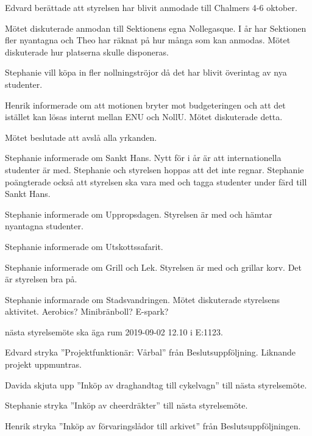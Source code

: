 \documentclass[10pt]{article}
\begin{document}
\begin{paragrafer}
Edvard berättade att styrelsen har blivit anmodade till Chalmers 4-6 oktober. 

Mötet diskuterade anmodan till Sektionens egna Nollegasque. I år har Sektionen fler nyantagna och Theo har räknat på hur många som kan anmodas. Mötet diskuterade hur platserna skulle disponeras.


Stephanie vill köpa in fler nollningströjor då det har blivit överintag av nya studenter. 

Henrik informerade om att motionen bryter mot budgeteringen och att det istället kan lösas internt mellan ENU och NollU. Mötet diskuterade detta. 

Mötet beslutade att avslå alla yrkanden. 

Stephanie informerade om Sankt Hans. Nytt för i år är att internationella studenter är med.
Stephanie och styrelsen hoppas att det inte regnar. Stephanie poängterade också att styrelsen ska vara med och tagga studenter under färd till Sankt Hans. 

Stephanie informerade om Uppropsdagen. Styrelsen är med och hämtar nyantagna studenter. 

Stephanie informerade om Utskottssafarit. 

Stephanie informerade om Grill och Lek. Styrelsen är med och grillar korv. Det är styrelsen bra på.  

Stephanie informarade om Stadsvandringen. Mötet diskuterade styrelsens aktivitet. Aerobics? Minibränboll? E-spark? 


\Mba nästa styrelsemöte ska äga rum 2019-09-02 12.10 i E:1123.


Edvard \ypa stryka ''Projektfunktionär: Vårbal'' från Beslutsuppföljning. Liknande projekt uppmuntras.

\Mbaby

Davida \ypa skjuta upp ''Inköp av draghandtag till cykelvagn'' till nästa styrelsemöte.

\Mbaby

Stephanie \ypa stryka ''Inköp av cheerdräkter'' till nästa styrelsemöte. 

\Mbaby

Henrik \ypa stryka ''Inköp av förvaringslådor till arkivet'' från Beslutsuppföljningen. 

\Mbaby


\end{paragrafer}
\end{document}
